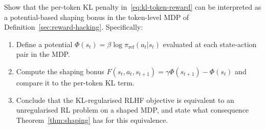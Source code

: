 \begin{exercise}
\label{ex:potential-kl}
Show that the per-token KL penalty in~\eqref{eq:kl-token-reward} can be interpreted as a potential-based shaping bonus in the token-level MDP of Definition~\ref{sec:reward-hacking}. Specifically:
\begin{enumerate}
  \item Define a potential $\Phi(s_t) = \beta\log\pi_{\mathrm{ref}}(a_t | s_t)$ evaluated at each state-action pair in the MDP.
  \item Compute the shaping bonus $F(s_t, a_t, s_{t+1}) = \gamma\Phi(s_{t+1}) - \Phi(s_t)$ and compare it to the per-token KL term.
  \item Conclude that the KL-regularised RLHF objective is equivalent to an unregularised RL problem on a shaped MDP, and state what consequence Theorem~\ref{thm:shaping} has for this equivalence.
\end{enumerate}
\end{exercise}

